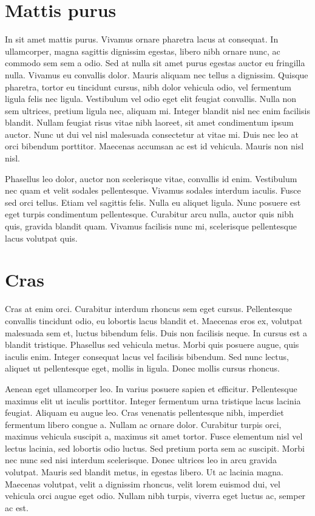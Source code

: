 \documentclass{book}
\begin{document}
\chapter{Mattis purus}

In sit amet mattis purus. Vivamus ornare pharetra lacus at consequat. In ullamcorper, magna sagittis dignissim egestas, libero nibh ornare nunc, ac commodo sem sem a odio. Sed at nulla sit amet purus egestas auctor eu fringilla nulla. Vivamus eu convallis dolor. Mauris aliquam nec tellus a dignissim. Quisque pharetra, tortor eu tincidunt cursus, nibh dolor vehicula odio, vel fermentum ligula felis nec ligula. Vestibulum vel odio eget elit feugiat convallis. Nulla non sem ultrices, pretium ligula nec, aliquam mi. Integer blandit nisl nec enim facilisis blandit. Nullam feugiat risus vitae nibh laoreet, sit amet condimentum ipsum auctor. Nunc ut dui vel nisl malesuada consectetur at vitae mi. Duis nec leo at orci bibendum porttitor. Maecenas accumsan ac est id vehicula. Mauris non nisl nisl.

Phasellus leo dolor, auctor non scelerisque vitae, convallis id enim. Vestibulum nec quam et velit sodales pellentesque. Vivamus sodales interdum iaculis. Fusce sed orci tellus. Etiam vel sagittis felis. Nulla eu aliquet ligula. Nunc posuere est eget turpis condimentum pellentesque. Curabitur arcu nulla, auctor quis nibh quis, gravida blandit quam. Vivamus facilisis nunc mi, scelerisque pellentesque lacus volutpat quis.

\chapter{Cras}

Cras at enim orci. Curabitur interdum rhoncus sem eget cursus. Pellentesque convallis tincidunt odio, eu lobortis lacus blandit et. Maecenas eros ex, volutpat malesuada sem et, luctus bibendum felis. Duis non facilisis neque. In cursus est a blandit tristique. Phasellus sed vehicula metus. Morbi quis posuere augue, quis iaculis enim. Integer consequat lacus vel facilisis bibendum. Sed nunc lectus, aliquet ut pellentesque eget, mollis in ligula. Donec mollis cursus rhoncus.

Aenean eget ullamcorper leo. In varius posuere sapien et efficitur. Pellentesque maximus elit ut iaculis porttitor. Integer fermentum urna tristique lacus lacinia feugiat. Aliquam eu augue leo. Cras venenatis pellentesque nibh, imperdiet fermentum libero congue a. Nullam ac ornare dolor. Curabitur turpis orci, maximus vehicula suscipit a, maximus sit amet tortor. Fusce elementum nisl vel lectus lacinia, sed lobortis odio luctus. Sed pretium porta sem ac suscipit. Morbi nec nunc sed nisi interdum scelerisque. Donec ultrices leo in arcu gravida volutpat. Mauris sed blandit metus, in egestas libero. Ut ac lacinia magna. Maecenas volutpat, velit a dignissim rhoncus, velit lorem euismod dui, vel vehicula orci augue eget odio. Nullam nibh turpis, viverra eget luctus ac, semper ac est.
\end{document}

